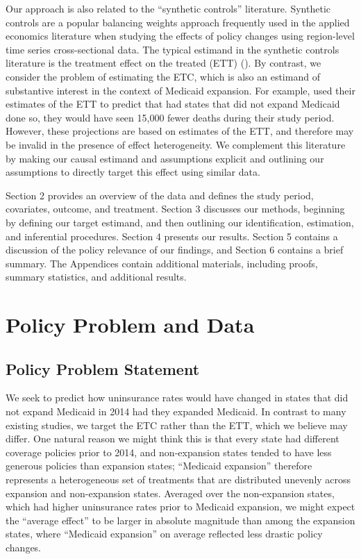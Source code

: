 \documentclass[aoas]{imsart}
\theoremstyle{plain}
\theoremstyle{remark}
\begin{document}
Our approach is also related to the ``synthetic controls'' literature. Synthetic controls are a popular balancing weights approach frequently used in the applied economics literature when studying the effects of policy changes using region-level time series cross-sectional data. The typical estimand in the synthetic controls literature is the treatment effect on the treated (ETT) (\cite{abadie2010synthetic}). By contrast, we consider the problem of estimating the ETC, which is also an estimand of substantive interest in the context of Medicaid expansion. For example, \cite{miller2019medicaid} used their estimates of the ETT to predict that had states that did not expand Medicaid done so, they would have seen 15,000 fewer deaths during their study period. However, these projections are based on estimates of the ETT, and therefore may be invalid in the presence of effect heterogeneity. We complement this literature by making our causal estimand and assumptions explicit and outlining our assumptions to directly target this effect using similar data.

Section 2 provides an overview of the data and defines the study period, covariates, outcome, and treatment. Section 3 discusses our methods, beginning by defining our target estimand, and then outlining our identification, estimation, and inferential procedures. Section 4 presents our results. Section 5 contains a discussion of the policy relevance of our findings, and Section 6 contains a brief summary. The Appendices contain additional materials, including proofs, summary statistics, and additional results.

\section{Policy Problem and Data}

\subsection{Policy Problem Statement}

We seek to predict how uninsurance rates would have changed in states that did not expand Medicaid in 2014 had they expanded Medicaid. In contrast to many existing studies, we target the ETC rather than the ETT, which we believe may differ. One natural reason we might think this is that every state had different coverage policies prior to 2014, and non-expansion states tended to have less generous policies than expansion states; ``Medicaid expansion'' therefore represents a heterogeneous set of treatments that are distributed unevenly across expansion and non-expansion states. Averaged over the non-expansion states, which had higher uninsurance rates prior to Medicaid expansion, we might expect the ``average effect'' to be larger in absolute magnitude than among the expansion states, where ``Medicaid expansion'' on average reflected less drastic policy changes.
\end{document}
